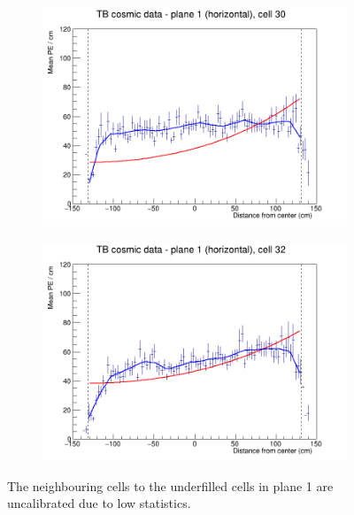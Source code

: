 \documentclass[12pt,a4paper]{article}
\begin{document}
\begin{figure}[h]
  \begin{subfigure}{0.5\textwidth}
    \includegraphics[width=\linewidth]{RelativeCalibrationResults/p2_001_030.png}
  \end{subfigure}
  \begin{subfigure}{0.5\textwidth}
    \includegraphics[width=\linewidth]{RelativeCalibrationResults/p2_001_032.png}
  \end{subfigure}
  \caption{The neighbouring cells to the underfilled cells in plane 1 are uncalibrated due to low statistics.}
  \label{figAttenfitResultsPerio2_UnderfilledCellsPlane01}
\end{figure}
\end{document}
